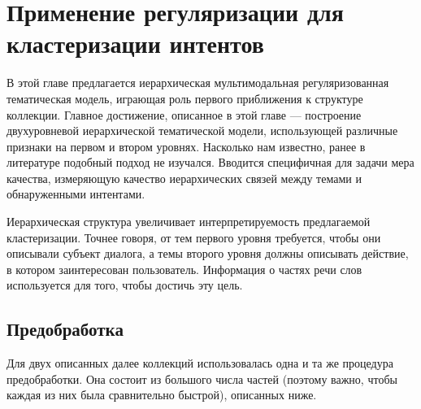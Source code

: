 \chapter{Применение регуляризации для кластеризации интентов}

В этой главе предлагается иерархическая мультимодальная регуляризованная тематическая модель, играющая роль первого приближения к структуре коллекции. Главное достижение, описанное в этой главе --- построение двухуровневой иерархической тематической модели, использующей различные признаки на первом и втором уровнях. Насколько нам известно, ранее в литературе подобный подход не изучался.  Вводится специфичная для задачи мера качества, измеряющую качество иерархических связей между темами и обнаруженными интентами.

Иерархическая структура увеличивает интерпретируемость предлагаемой кластеризации. Точнее говоря, от тем первого уровня требуется, чтобы они описывали субъект диалога, а темы второго уровня должны описывать действие, в котором заинтересован пользователь. Информация о частях речи слов используется для того, чтобы достичь эту цель.


\section{Предобработка} \label{nlp_methods}

Для двух описанных далее коллекций использовалась одна и та же процедура предобработки. Она состоит из большого числа частей (поэтому важно, чтобы каждая из них была сравнительно быстрой), описанных ниже.

